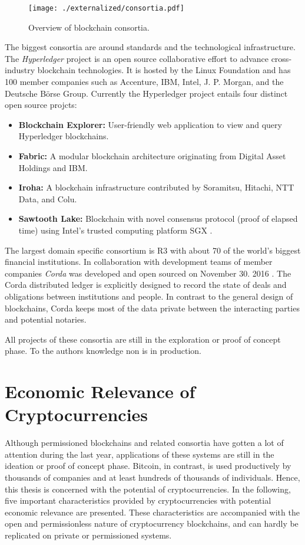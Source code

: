 \begin{figure}[ht]
\centering
\texttt{[image: ./externalized/consortia.pdf]}
\caption{Overview of blockchain consortia.}
\label{fig:eco:consortia}
\end{figure}

The biggest consortia are around standards and the technological infrastructure. The \emph{Hyperledger}  project is an open source collaborative effort to advance cross-industry blockchain technologies. It is hosted by the Linux Foundation and has 100 member companies such as Accenture, IBM, Intel, J. P. Morgan, and the Deutsche B\"orse Group. Currently the Hyperledger project entails four distinct open source projcts:
\begin{itemize}
	\item \textbf{Blockchain Explorer:} User-friendly web application to view and query Hyperledger blockchains.
	\item \textbf{Fabric:} A modular blockchain architecture originating from Digital Asset Holdings and IBM.
	\item \textbf{Iroha:} A blockchain infrastructure contributed by Soramitsu, Hitachi, NTT Data, and Colu.
	\item \textbf{Sawtooth Lake:} Blockchain with novel consensus protocol (proof of elapsed time) using Intel's trusted computing platform SGX \parencite{cryptoeprint:2016:086}.
\end{itemize}

The largest domain specific consortium is R3 with about 70 of the world's biggest financial institutions. In collaboration with development teams of member companies \emph{Corda} was developed and open sourced on November 30. 2016 \parencite{Brown2016corda}. The Corda distributed ledger is explicitly designed to record the state of deals and obligations between institutions and people. In contrast to the general design of blockchains, Corda keeps most of the data private between the interacting parties and potential notaries.

All projects of these consortia are still in the exploration or proof of concept phase. To the authors knowledge non is in production.


\section{Economic Relevance of Cryptocurrencies}

Although permissioned blockchains and related consortia have gotten a lot of attention during the last year, applications of these systems are still in the ideation or proof of concept phase. Bitcoin, in contrast, is used productively by thousands of companies and at least hundreds of thousands of individuals. Hence, this thesis is concerned with the potential of cryptocurrencies. In the following, five important characteristics provided by cryptocurrencies with potential economic relevance are presented. These characteristics are accompanied with the open and permissionless nature of cryptocurrency blockchains, and can hardly be replicated on private or permissioned systems.

